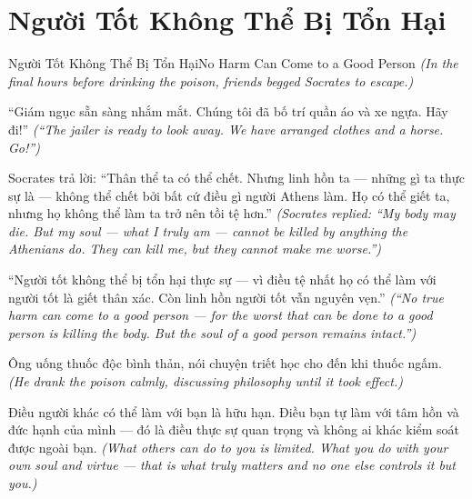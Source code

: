 \section{Người Tốt Không Thể Bị Tổn Hại}
\begin{truyen}{Người Tốt Không Thể Bị Tổn Hại}{No Harm Can Come to a Good Person}
\textit{(In the final hours before drinking the poison, friends begged Socrates to escape.)}

``Giám ngục sẵn sàng nhắm mắt. Chúng tôi đã bố trí quần áo và xe ngựa. Hãy đi!''
\textit{(``The jailer is ready to look away. We have arranged clothes and a horse. Go!'')}

Socrates trả lời: ``Thân thể ta có thể chết. Nhưng linh hồn ta — những gì ta thực sự là — không thể chết bởi bất cứ điều gì người Athens làm. Họ có thể giết ta, nhưng họ không thể làm ta trở nên tồi tệ hơn.''
\textit{(Socrates replied: ``My body may die. But my soul — what I truly am — cannot be killed by anything the Athenians do. They can kill me, but they cannot make me worse.'')}

``Người tốt không thể bị tổn hại thực sự — vì điều tệ nhất họ có thể làm với người tốt là giết thân xác. Còn linh hồn người tốt vẫn nguyên vẹn.''
\textit{(``No true harm can come to a good person — for the worst that can be done to a good person is killing the body. But the soul of a good person remains intact.'')}

Ông uống thuốc độc bình thản, nói chuyện triết học cho đến khi thuốc ngấm.
\textit{(He drank the poison calmly, discussing philosophy until it took effect.)}

\end{truyen}

\begin{baihoc}
Điều người khác có thể làm với bạn là hữu hạn. Điều bạn tự làm với tâm hồn và đức hạnh của mình — đó là điều thực sự quan trọng và không ai khác kiểm soát được ngoài bạn.
\textit{(What others can do to you is limited. What you do with your own soul and virtue — that is what truly matters and no one else controls it but you.)}
\end{baihoc}
\ngancach

